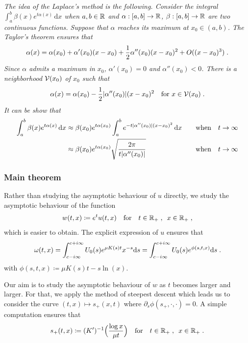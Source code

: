 \documentclass[11pt]{amsart}
\newcommand{\diff}{\,\mathrm{d}}
\begin{document}
        \textit{The idea of the Laplace's method is the following. Consider the integral 
        $\int_a^b \beta(x) e^{t\alpha(x)}\diff x$ when  $a,b \in \mathbb{R}$ and $\alpha : [a,b] \to \mathbb{R}$, $\beta : [a,b] \to \mathbb{R}$ are two continuous functions. Suppose that $\alpha$ reaches its maximum at $x_0 \in (a,b)$. The Taylor's theorem ensures that 
        \begin{align*}
            \alpha(x) = \alpha(x_0) + \alpha'(x_0)(x-x_0) + \frac{1}{2} \alpha''(x_0)(x-x_0)^2 + O((x-x_0)^3)
            \; .
        \end{align*}
        Since $\alpha$ admits a maximum in $x_0$, $\alpha'(x_0) = 0$ and $\alpha''(x_0) < 0$. There is a neighborhood $\mathcal{V}(x_0)$ of $x_0$ such that 
        $$ \alpha(x) = \alpha(x_0) - \frac{1}{2} |\alpha''(x_0)|(x-x_0)^2 \quad \text{for } x \in \mathcal{V}(x_0) \; .$$ 
        It can be show that
        \begin{align*}
        \int_a^b \beta(x) e^{t \alpha(x)}\diff x 
        &\approx  \beta(x_0) e^{t\alpha(x_0)} \int_a^b e^{-t|\alpha''(x_0)|(x-x_0)^2 }\diff x &\mtext{when} t \to \infty\\
        &\approx \beta(x_0) e^{t\alpha(x_0)} \sqrt{\frac{2 \pi}{t |\alpha''(x_0)|}} &\mtext{when} t \to \infty
        \end{align*}}
        
        \subsubsection{Main theorem} 

        Rather than studying the asymptotic behaviour of $u$ directly, we study the asymptotic behaviour of the function 
        \begin{align*}
            w(t,x) \coloneqq e^t u(t,x) 
            \quad \text{for} \quad t \in \mathbb{R}_+ \; , \enspace x \in \mathbb{R}_+
            \; ,
        \end{align*} which is easier to obtain. 
    The explicit expression of $u$ ensures that 
    \begin{equation*}
        \omega(t,x)
        = \int_{c-i\infty}^{c+i\infty} U_0(s) e^{\mu K(s)t}x^{-s} \mathrm ds
        =  \int_{c-i\infty}^{c+i\infty} U_0(s) e^{\phi(s, t, x)} \mathrm ds
        \; .
    \end{equation*}
with $\phi(s,t,x) \coloneqq \mu K(s) t - s \ln(x) $. 

Our aim is to study the asymptotic behaviour of $w$ as $t$ becomes larger and larger. For that, we apply the method of steepest descent which leads us to consider the curve $(t,x) \mapsto s_+(x,t)$ where $\partial_s \phi(s_+, \cdot,\cdot)= 0$. 
A simple computation ensures that
\begin{align*}
    s_+(t,x) \coloneqq (K')^{-1} \Big( \frac{\log x}{\mu t} \Big)
    \quad \text{for} \quad t \in \mathbb{R}_+ \; , \enspace x \in \mathbb{R}_+
    \; .
\end{align*}
\end{document}
